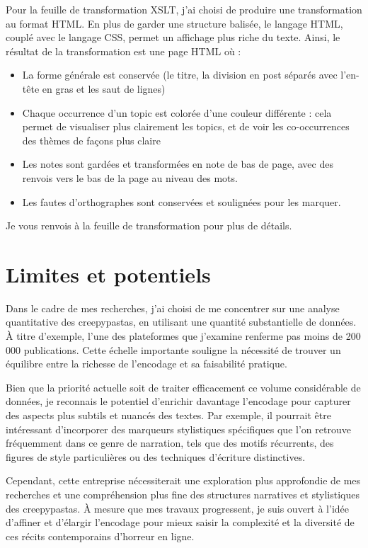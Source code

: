 \documentclass[onecolumn,12pt]{article}
\begin{document}
Pour la feuille de transformation XSLT, j'ai choisi de produire une transformation au format HTML. En plus de garder une structure balisée, le langage HTML, couplé avec le langage CSS, permet un affichage plus riche du texte. 
Ainsi, le résultat de la transformation est une page HTML où :
\begin{itemize}
    \item  La forme générale est conservée (le titre, la division en post séparés avec l'en-tête en gras et les saut de lignes) 

\item Chaque occurrence d'un topic est colorée d'une couleur différente : cela permet de visualiser plus clairement les topics, et de voir les co-occurrences des thèmes de façons plus claire
\item  Les notes sont gardées et transformées en note de bas de page, avec des renvois vers le bas de la page au niveau des mots.
\item  Les fautes d'orthographes sont conservées et soulignées pour les marquer.
\end{itemize}

Je vous renvois à la feuille de transformation pour plus de détails.

\section{Limites et potentiels}
Dans le cadre de mes recherches, j'ai choisi de me concentrer sur une analyse quantitative des creepypastas, en utilisant une quantité substantielle de données. À titre d'exemple, l'une des plateformes que j'examine renferme pas moins de 200 000 publications. Cette échelle importante souligne la nécessité de trouver un équilibre entre la richesse de l'encodage et sa faisabilité pratique.

Bien que la priorité actuelle soit de traiter efficacement ce volume considérable de données, je reconnais le potentiel d'enrichir davantage l'encodage pour capturer des aspects plus subtils et nuancés des textes. Par exemple, il pourrait être intéressant d'incorporer des marqueurs stylistiques spécifiques que l'on retrouve fréquemment dans ce genre de narration, tels que des motifs récurrents, des figures de style particulières ou des techniques d'écriture distinctives.

Cependant, cette entreprise nécessiterait une exploration plus approfondie de mes recherches et une compréhension plus fine des structures narratives et stylistiques des creepypastas. À mesure que mes travaux progressent, je suis ouvert à l'idée d'affiner et d'élargir l'encodage pour mieux saisir la complexité et la diversité de ces récits contemporains d'horreur en ligne.
\end{document}

